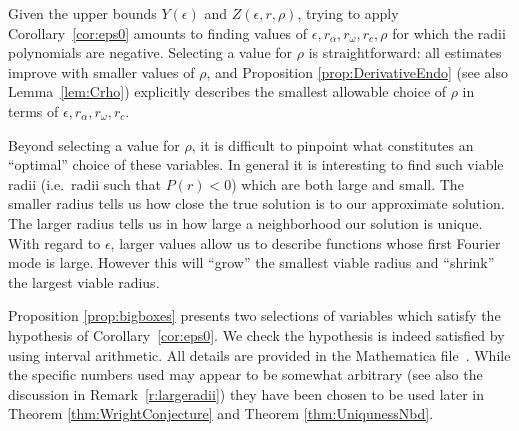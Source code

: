 Given the upper bounds $ Y(\epsilon)$ and $ Z( \epsilon ,r , \rho)$, 
trying to apply Corollary~\ref{cor:eps0} amounts to finding values of $ \epsilon, r_\alpha, r_\omega, r_c,\rho$ for which the radii polynomials are negative.
Selecting a value for $ \rho$ is straightforward: all estimates improve with smaller values of $\rho$, and Proposition \ref{prop:DerivativeEndo} (see also Lemma~\ref{lem:Crho}) explicitly describes the smallest allowable choice of $\rho$ in terms of $ \epsilon,r_\alpha,r_\omega,r_c$. 

Beyond selecting a value for $ \rho$, it is difficult to pinpoint what constitutes an ``optimal'' choice of these variables. 
In general it is interesting to find such  viable radii (i.e.\ radii such that $P(r)<0$) which are both large and small.  
The smaller radius tells us how close the true solution is to our approximate solution. 
The larger radius tells us in how large a neighborhood our solution is unique.  With regard to $\epsilon$, larger values allow us to describe functions whose first Fourier mode is large. However this will ``grow'' the smallest viable radius and ``shrink'' the largest viable radius. 

Proposition \ref{prop:bigboxes} presents two selections of variables which satisfy the hypothesis of Corollary~\ref{cor:eps0}.  
We check the hypothesis is indeed satisfied by using interval arithmetic.
All details are provided in the Mathematica file~\cite{mathematicafile}. 
While the specific numbers used may appear to be somewhat arbitrary (see also the discussion in Remark~\ref{r:largeradii})  they have been chosen to be used later in Theorem 
\ref{thm:WrightConjecture} and Theorem \ref{thm:UniqunessNbd}.  




